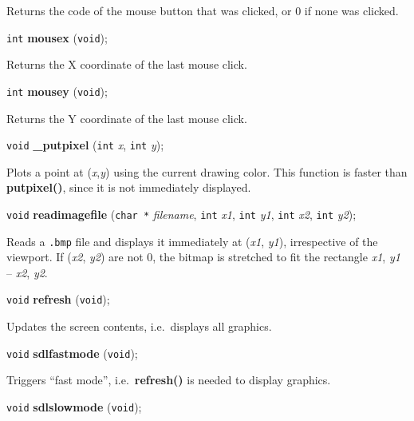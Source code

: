 \documentclass[a4paper,11pt]{article}
\newcommand{\V}{\texttt{void}}      %
\newcommand{\I}{\texttt{int}}       %
\newcommand{\C}{\texttt{char *}}    %
\newcommand{\func}[1]{\textbf{#1}}  %
\newcommand{\A}[1]{\emph{#1}}       %
\newcommand{\F}[1]{\texttt{#1}}     %
\newenvironment{bgi}
{ %
  \begin{snugshade}
}
{ %
  \end{snugshade}
}
\begin{document}
Returns the code of the mouse button that was clicked, or 0 if none
was clicked.


\begin{bgi}
\I{} \func{mousex} (\V{});
\end{bgi}

Returns the X coordinate of the last mouse click.


\begin{bgi}
\I{} \func{mousey} (\V{});
\end{bgi}

Returns the Y coordinate of the last mouse click.


\begin{bgi}
\V{} \func{\_putpixel} (\I{} \A{x}, \I{} \A{y}); 
\end{bgi}

Plots a point at (\A{x},\A{y}) using the current drawing color. This
function is faster than \func{putpixel()}, since it is not immediately
displayed.


\begin{bgi}
\V{} \func{readimagefile} (\C{} \A{filename}, \I{} \A{x1}, \I{} \A{y1}, 
\I{} \A{x2}, \I{} \A{y2});
\end{bgi}

Reads a \F{.bmp} file and displays it immediately at (\A{x1}, \A{y1}),
irrespective of the viewport. If (\A{x2}, \A{y2}) are not 0, the
bitmap is stretched to fit the rectangle \A{x1}, \A{y1} -- \A{x2},
\A{y2}.


\begin{bgi}
\V{} \func{refresh} (\V{}); 
\end{bgi}

Updates the screen contents, i.e.\ displays all graphics.


\begin{bgi}
\V{} \func{sdlfastmode} (\V{}); 
\end{bgi}

Triggers ``fast mode'', i.e.\ \func{refresh()} is needed to display
graphics.


\begin{bgi}
\V{} \func{sdlslowmode} (\V{}); 
\end{bgi}
\end{document}
